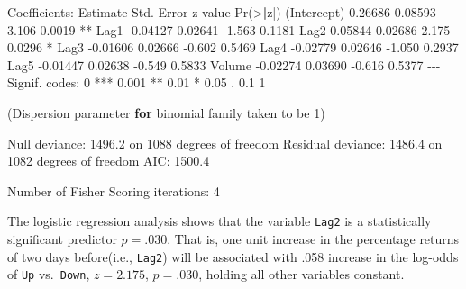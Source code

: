 \documentclass[
]{article}
\newenvironment{Shaded}{\begin{snugshade}}{\end{snugshade}}
\newcommand{\ControlFlowTok}[1]{\textcolor[rgb]{0.13,0.29,0.53}{\textbf{#1}}}
\newcommand{\DecValTok}[1]{\textcolor[rgb]{0.00,0.00,0.81}{#1}}
\newcommand{\ErrorTok}[1]{\textcolor[rgb]{0.64,0.00,0.00}{\textbf{#1}}}
\newcommand{\FloatTok}[1]{\textcolor[rgb]{0.00,0.00,0.81}{#1}}
\newcommand{\FunctionTok}[1]{\textcolor[rgb]{0.00,0.00,0.00}{#1}}
\newcommand{\NormalTok}[1]{#1}
\newcommand{\SpecialCharTok}[1]{\textcolor[rgb]{0.00,0.00,0.00}{#1}}
\newcommand{\StringTok}[1]{\textcolor[rgb]{0.31,0.60,0.02}{#1}}
\begin{document}
\begin{Shaded}
\begin{Highlighting}[]
\NormalTok{Coefficients}\SpecialCharTok{:}
\NormalTok{            Estimate Std. Error z value }\FunctionTok{Pr}\NormalTok{(}\SpecialCharTok{\textgreater{}}\ErrorTok{|}\NormalTok{z}\SpecialCharTok{|}\NormalTok{)   }
\NormalTok{(Intercept)  }\FloatTok{0.26686}    \FloatTok{0.08593}   \FloatTok{3.106}   \FloatTok{0.0019} \SpecialCharTok{**}
\NormalTok{Lag1        }\SpecialCharTok{{-}}\FloatTok{0.04127}    \FloatTok{0.02641}  \SpecialCharTok{{-}}\FloatTok{1.563}   \FloatTok{0.1181}   
\NormalTok{Lag2         }\FloatTok{0.05844}    \FloatTok{0.02686}   \FloatTok{2.175}   \FloatTok{0.0296} \SpecialCharTok{*} 
\NormalTok{Lag3        }\SpecialCharTok{{-}}\FloatTok{0.01606}    \FloatTok{0.02666}  \SpecialCharTok{{-}}\FloatTok{0.602}   \FloatTok{0.5469}   
\NormalTok{Lag4        }\SpecialCharTok{{-}}\FloatTok{0.02779}    \FloatTok{0.02646}  \SpecialCharTok{{-}}\FloatTok{1.050}   \FloatTok{0.2937}   
\NormalTok{Lag5        }\SpecialCharTok{{-}}\FloatTok{0.01447}    \FloatTok{0.02638}  \SpecialCharTok{{-}}\FloatTok{0.549}   \FloatTok{0.5833}   
\NormalTok{Volume      }\SpecialCharTok{{-}}\FloatTok{0.02274}    \FloatTok{0.03690}  \SpecialCharTok{{-}}\FloatTok{0.616}   \FloatTok{0.5377}   
\SpecialCharTok{{-}{-}{-}}
\NormalTok{Signif. codes}\SpecialCharTok{:}  \DecValTok{0} \StringTok{\textquotesingle{}***\textquotesingle{}} \FloatTok{0.001} \StringTok{\textquotesingle{}**\textquotesingle{}} \FloatTok{0.01} \StringTok{\textquotesingle{}*\textquotesingle{}} \FloatTok{0.05} \StringTok{\textquotesingle{}.\textquotesingle{}} \FloatTok{0.1} \StringTok{\textquotesingle{} \textquotesingle{}} \DecValTok{1}

\NormalTok{(Dispersion parameter }\ControlFlowTok{for}\NormalTok{ binomial family taken to be }\DecValTok{1}\NormalTok{)}

\NormalTok{    Null deviance}\SpecialCharTok{:} \FloatTok{1496.2}\NormalTok{  on }\DecValTok{1088}\NormalTok{  degrees of freedom}
\NormalTok{Residual deviance}\SpecialCharTok{:} \FloatTok{1486.4}\NormalTok{  on }\DecValTok{1082}\NormalTok{  degrees of freedom}
\NormalTok{AIC}\SpecialCharTok{:} \FloatTok{1500.4}

\NormalTok{Number of Fisher Scoring iterations}\SpecialCharTok{:} \DecValTok{4}
\end{Highlighting}
\end{Shaded}

The logistic regression analysis shows that the variable \texttt{Lag2}
is a statistically significant predictor \(p = .030\). That is, one unit
increase in the percentage returns of two days before(i.e.,
\texttt{Lag2}) will be associated with .058 increase in the log-odds of
\texttt{Up} vs.~\texttt{Down}, \(z = 2.175\), \(p=.030\), holding all
other variables constant.
\end{document}
